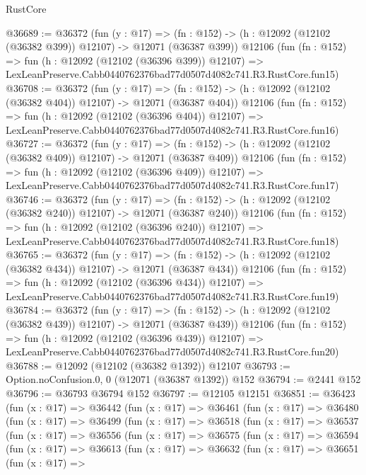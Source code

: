 \begin{lexlean}{RustCore}
\begin{coremodule}
@36689 := @36372
    (fun (y : @17) =>
    (fn : @152) -> (h : @12092 (@12102 (@36382 @399)) @12107) -> @12071 (@36387 @399))
    @12106
    (fun (fn : @152) =>
    fun (h : @12092 (@12102 (@36396 @399)) @12107) =>
    LexLeanPreserve.Cabb0440762376bad77d0507d4082c741.R3.RustCore.fun15)
@36708 := @36372
    (fun (y : @17) =>
    (fn : @152) -> (h : @12092 (@12102 (@36382 @404)) @12107) -> @12071 (@36387 @404))
    @12106
    (fun (fn : @152) =>
    fun (h : @12092 (@12102 (@36396 @404)) @12107) =>
    LexLeanPreserve.Cabb0440762376bad77d0507d4082c741.R3.RustCore.fun16)
@36727 := @36372
    (fun (y : @17) =>
    (fn : @152) -> (h : @12092 (@12102 (@36382 @409)) @12107) -> @12071 (@36387 @409))
    @12106
    (fun (fn : @152) =>
    fun (h : @12092 (@12102 (@36396 @409)) @12107) =>
    LexLeanPreserve.Cabb0440762376bad77d0507d4082c741.R3.RustCore.fun17)
@36746 := @36372
    (fun (y : @17) =>
    (fn : @152) -> (h : @12092 (@12102 (@36382 @240)) @12107) -> @12071 (@36387 @240))
    @12106
    (fun (fn : @152) =>
    fun (h : @12092 (@12102 (@36396 @240)) @12107) =>
    LexLeanPreserve.Cabb0440762376bad77d0507d4082c741.R3.RustCore.fun18)
@36765 := @36372
    (fun (y : @17) =>
    (fn : @152) -> (h : @12092 (@12102 (@36382 @434)) @12107) -> @12071 (@36387 @434))
    @12106
    (fun (fn : @152) =>
    fun (h : @12092 (@12102 (@36396 @434)) @12107) =>
    LexLeanPreserve.Cabb0440762376bad77d0507d4082c741.R3.RustCore.fun19)
@36784 := @36372
    (fun (y : @17) =>
    (fn : @152) -> (h : @12092 (@12102 (@36382 @439)) @12107) -> @12071 (@36387 @439))
    @12106
    (fun (fn : @152) =>
    fun (h : @12092 (@12102 (@36396 @439)) @12107) =>
    LexLeanPreserve.Cabb0440762376bad77d0507d4082c741.R3.RustCore.fun20)
@36788 := @12092 (@12102 (@36382 @1392)) @12107
@36793 := Option.noConfusion.{0, 0} (@12071 (@36387 @1392)) @152
@36794 := @2441 @152
@36796 := @36793 @36794 @152
@36797 := @12105 @12151
@36851 := @36423
    (fun (x : @17) =>
    @36442
      (fun (x : @17) =>
      @36461
        (fun (x : @17) =>
        @36480
          (fun (x : @17) =>
          @36499
            (fun (x : @17) =>
            @36518
              (fun (x : @17) =>
              @36537
                (fun (x : @17) =>
                @36556
                  (fun (x : @17) =>
                  @36575
                    (fun (x : @17) =>
                    @36594
                      (fun (x : @17) =>
                      @36613
                        (fun (x : @17) =>
                        @36632
                          (fun (x : @17) =>
                          @36651
                            (fun (x : @17) =>

\end{coremodule}
\end{lexlean}
